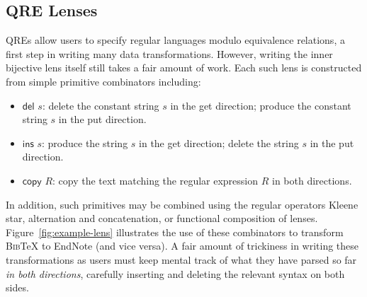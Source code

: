 \documentclass[acmsmall,review,anonymous]{acmart}
\newcommand{\kw}[1]{\ensuremath{\mathsf{#1}}}
\newcommand{\bibtex}{\textsc{Bib}\TeX{}}
\begin{document}
\subsection{QRE Lenses}
QREs allow users to specify regular languages modulo equivalence relations,
a first step in writing many data transformations.  However, writing the
inner bijective lens itself still takes a fair amount of work.  Each such lens
is constructed from simple primitive combinators including:
%
\begin{itemize}
  \item \kw{del} $s$: delete the constant string $s$ in the get direction;
  produce the constant string $s$ in the put direction.
  \item \kw{ins} $s$: produce the string $s$ in the get direction;
  delete the string $s$ in the put direction.
  \item \kw{copy} $R$: copy the text matching the regular expression $R$ in both
  directions.
\end{itemize}
In addition, such primitives may be combined using the regular operators
Kleene star, alternation and concatenation, or functional composition of
lenses.  Figure~\ref{fig:example-lens} illustrates the use of these
combinators to transform \bibtex{} to EndNote (and vice versa).
A fair amount of trickiness in writing these transformations as users
must keep mental track of what they have parsed so far \emph{in both
directions}, carefully inserting and deleting the relevant syntax on both
sides.

\end{document}
